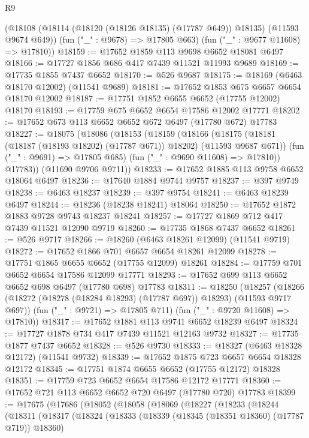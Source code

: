 \begin{lexlean}{R9}
\begin{coremodule}
{{{{{{{{{{{{{{{{{{{{{{{{{{{{{{{{{{{{{{{{{{{{{{{{{{{{{{{{{{{{{{{{{{{{{{{{{{{{{{{{{{{{      (@18108 (@18114 (@18120 (@18126 @18135) (@17787 @649)) @18135) (@11593 @9674 @649))
      (fun ("_" : @9678) => @17805 @663)
      (fun ("_" : @9677 @11608) => @17810))
@18159 := @17652 @1859 @113 @9698 @6652 @18081 @6497
@18166 := @17727 @1856 @686 @417 @7439 @11521 @11993 @9689
@18169 := @17735 @1855 @7437 @6652
@18170 := @526 @9687
@18175 := @18169 (@6463 @18170 @12002) (@11541 @9689)
@18181 := @17652 @1853 @675 @6657 @6654 @18170 @12002
@18187 := @17751 @1852 @6655 @6652 (@17755 @12002) @18170
@18193 := @17759 @675 @6652 @6654 @17586 @12002 @17771
@18202 := @17652 @673 @113 @6652 @6652 @672 @6497 (@17780 @672) @17783
@18227 := @18075
    (@18086
      (@18153
        (@18159
          (@18166
            (@18175 (@18181 (@18187 (@18193 @18202) (@17787 @671)) @18202) (@11593 @9687 @671))
            (fun ("_" : @9691) => @17805 @685)
            (fun ("_" : @9690 @11608) => @17810))
          @17783))
      (@11690 @9706 @9711))
@18233 := @17652 @1885 @113 @9758 @6652 @18064 @6497
@18236 := @17640 @1884 @9744 @9757
@18237 := @397 @9749
@18238 := @6463 @18237
@18239 := @397 @9754
@18241 := @6463 @18239 @6497
@18244 := @18236 (@18238 @18241) @18064
@18250 := @17652 @1872 @1883 @9728 @9743 @18237 @18241
@18257 := @17727 @1869 @712 @417 @7439 @11521 @12090 @9719
@18260 := @17735 @1868 @7437 @6652
@18261 := @526 @9717
@18266 := @18260 (@6463 @18261 @12099) (@11541 @9719)
@18272 := @17652 @1866 @701 @6657 @6654 @18261 @12099
@18278 := @17751 @1865 @6655 @6652 (@17755 @12099) @18261
@18284 := @17759 @701 @6652 @6654 @17586 @12099 @17771
@18293 := @17652 @699 @113 @6652 @6652 @698 @6497 (@17780 @698) @17783
@18311 := @18250
    (@18257
      (@18266 (@18272 (@18278 (@18284 @18293) (@17787 @697)) @18293) (@11593 @9717 @697))
      (fun ("_" : @9721) => @17805 @711)
      (fun ("_" : @9720 @11608) => @17810))
@18317 := @17652 @1881 @113 @9741 @6652 @18239 @6497
@18324 := @17727 @1878 @734 @417 @7439 @11521 @12163 @9732
@18327 := @17735 @1877 @7437 @6652
@18328 := @526 @9730
@18333 := @18327 (@6463 @18328 @12172) (@11541 @9732)
@18339 := @17652 @1875 @723 @6657 @6654 @18328 @12172
@18345 := @17751 @1874 @6655 @6652 (@17755 @12172) @18328
@18351 := @17759 @723 @6652 @6654 @17586 @12172 @17771
@18360 := @17652 @721 @113 @6652 @6652 @720 @6497 (@17780 @720) @17783
@18399 := @17675
    (@17686
      (@18052
        (@18058
          (@18069
            (@18227
              (@18233
                (@18244
                  (@18311
                    (@18317
                      (@18324
                        (@18333
                          (@18339 (@18345 (@18351 @18360) (@17787 @719)) @18360)
}}}}}}}}}}}}}}}}}}}}}}}}}}}}}}}}}}}}}}}}}}}}}}}}}}}}}}}}}}}}}}}}}}}}}}}}}}}}}}}}}}}}
\end{coremodule}
\end{lexlean}
